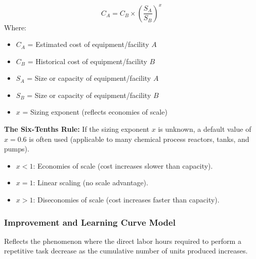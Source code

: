 \documentclass[12pt,a4paper]{article}
\begin{document}
\begin{tcolorbox}[formulabox, title={\textbf{Power-Sizing Formula}}]
\begin{equation}
  C_A = C_B \times \left( \frac{S_A}{S_B} \right)^x
\end{equation}
Where:
\begin{itemize}[leftmargin=1.5em, itemsep=1pt, topsep=2pt]
  \item[] $C_A$ = Estimated cost of equipment/facility $A$
  \item[] $C_B$ = Historical cost of equipment/facility $B$
  \item[] $S_A$ = Size or capacity of equipment/facility $A$
  \item[] $S_B$ = Size or capacity of equipment/facility $B$
  \item[] $x$ = Sizing exponent (reflects economies of scale)
\end{itemize}
\par\vspace{4pt}
\textbf{The Six-Tenths Rule:} If the sizing exponent $x$ is unknown, a default value of $x = 0.6$ is often used (applicable to many chemical process reactors, tanks, and pumps).
\begin{itemize}[leftmargin=*, itemsep=2pt, topsep=2pt]
  \item[] $x < 1$: Economies of scale (cost increases slower than capacity).
  \item[] $x = 1$: Linear scaling (no scale advantage).
  \item[] $x > 1$: Diseconomies of scale (cost increases faster than capacity).
\end{itemize}
\end{tcolorbox}

\subsubsection{Improvement and Learning Curve Model}
Reflects the phenomenon where the direct labor hours required to perform a repetitive task decrease as the cumulative number of units produced increases.
\end{document}
